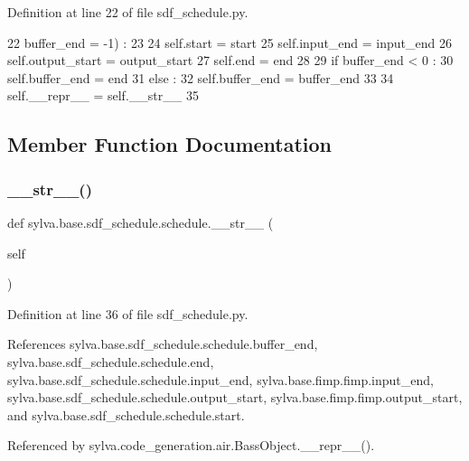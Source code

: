Definition at line 22 of file sdf\+\_\+schedule.\+py.


\begin{DoxyCode}
22     buffer\_end = -1) :
23 
24     self.start = start
25     self.input\_end = input\_end
26     self.output\_start = output\_start
27     self.end = end
28 
29     \textcolor{keywordflow}{if} buffer\_end < 0 :
30       self.buffer\_end = end
31     \textcolor{keywordflow}{else} :
32       self.buffer\_end = buffer\_end
33 
34     self.\_\_repr\_\_ = self.\_\_str\_\_
35 
\end{DoxyCode}


\subsection{Member Function Documentation}
\mbox{\label{classsylva_1_1base_1_1sdf__schedule_1_1schedule_a22e37ed6ccea017541f563714c0af989}} 
\subsubsection{\texorpdfstring{\+\_\+\+\_\+str\+\_\+\+\_\+()}{\_\_str\_\_()}}
{\footnotesize\ttfamily def sylva.\+base.\+sdf\+\_\+schedule.\+schedule.\+\_\+\+\_\+str\+\_\+\+\_\+ (\begin{DoxyParamCaption}\item[{}]{self }\end{DoxyParamCaption})}



Definition at line 36 of file sdf\+\_\+schedule.\+py.



References sylva.\+base.\+sdf\+\_\+schedule.\+schedule.\+buffer\+\_\+end, sylva.\+base.\+sdf\+\_\+schedule.\+schedule.\+end, sylva.\+base.\+sdf\+\_\+schedule.\+schedule.\+input\+\_\+end, sylva.\+base.\+fimp.\+fimp.\+input\+\_\+end, sylva.\+base.\+sdf\+\_\+schedule.\+schedule.\+output\+\_\+start, sylva.\+base.\+fimp.\+fimp.\+output\+\_\+start, and sylva.\+base.\+sdf\+\_\+schedule.\+schedule.\+start.



Referenced by sylva.\+code\+\_\+generation.\+air.\+Bass\+Object.\+\_\+\+\_\+repr\+\_\+\+\_\+().


